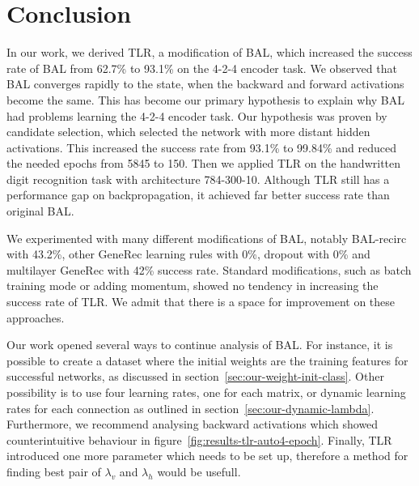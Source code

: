 
\section*{Conclusion}
\label{sec:conclusion} 

In our work, we derived TLR, a modification of BAL, which increased the success rate of BAL from 62.7\% to 93.1\% on the 4-2-4 encoder task. We observed that BAL converges rapidly to the state, when the backward and forward activations become the same. This has become our primary hypothesis to explain why BAL had problems learning the 4-2-4 encoder task. Our hypothesis was proven by candidate selection, which selected the network with more distant hidden activations. This increased the success rate from 93.1\% to 99.84\% and reduced the needed epochs from 5845 to 150. Then we applied TLR on the handwritten digit recognition task with architecture 784-300-10. Although TLR still has a performance gap on backpropagation, it achieved far better success rate than original BAL. %

We experimented with many different modifications of BAL, notably BAL-recirc with 43.2\%, other GeneRec learning rules with 0\%, dropout with 0\% and multilayer GeneRec with 42\% success rate. Standard modifications, such as batch training mode or adding momentum, showed no tendency in increasing the success rate of TLR. We admit that there is a space for improvement on these approaches.

\label{sec:future-work}
Our work opened several ways to continue analysis of BAL. For instance, it is possible to create a dataset where the initial weights are the training features for successful networks, as discussed in section~\ref{sec:our-weight-init-class}. Other possibility is to use four learning rates, one for each matrix, or dynamic learning rates for each connection as outlined in section~\ref{sec:our-dynamic-lambda}. Furthermore, we recommend analysing backward activations which showed counterintuitive behaviour in figure~\ref{fig:results-tlr-auto4-epoch}. Finally, TLR introduced one more parameter which needs to be set up, therefore a method for finding best pair of $\lambda_v$ and $\lambda_h$ would be usefull. 


